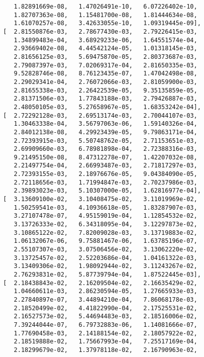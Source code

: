 \documentclass[11pt,a4j,fleqn]{jarticle}
\begin{document}
\begin{verbatim}
          1.82891669e-08,   1.47026491e-10,   6.07226402e-10,
          1.82707363e-08,   1.15481700e-08,   1.81444634e-08,
          1.61070257e-08,   3.42633055e-10,   1.09319445e-09],
       [  2.81550876e-03,   2.78677430e-03,   2.79226415e-03,
          1.34899483e-04,   3.68929233e-06,   1.64551574e-04,
          2.93669402e-08,   4.44542124e-05,   1.01318145e-03,
          2.81656125e-03,   5.69475870e-05,   2.80373687e-03,
          2.79087397e-03,   7.02069317e-04,   2.81650335e-03,
          9.52828746e-08,   8.76123435e-07,   1.47042498e-08,
          2.29029341e-04,   2.76072066e-03,   2.81059900e-03,
          2.81655338e-03,   2.26422539e-05,   9.35135859e-05,
          2.81371506e-03,   1.77843188e-03,   2.79426887e-03,
          2.48050105e-03,   5.27658967e-05,   1.68353242e-04],
       [  2.72292128e-03,   2.69513174e-03,   2.70044107e-03,
          1.30463338e-04,   3.56797063e-06,   1.59140326e-04,
          2.84012138e-08,   4.29923439e-05,   9.79863171e-04,
          2.72393915e-03,   5.50748762e-05,   2.71153651e-03,
          2.69909660e-03,   6.78981898e-04,   2.72388316e-03,
          9.21495150e-08,   8.47312278e-07,   1.42207032e-08,
          2.21497754e-04,   2.66993487e-03,   2.71817297e-03,
          2.72393155e-03,   2.18976676e-05,   9.04384090e-05,
          2.72118656e-03,   1.71994847e-03,   2.70237986e-03,
          2.39893023e-03,   5.10307000e-05,   1.62816977e-04],
       [  3.13609100e-02,   3.10408475e-02,   3.11019969e-02,
          1.50259541e-03,   4.10936618e-05,   1.83287907e-03,
          3.27107478e-07,   4.95159019e-04,   1.12854532e-02,
          3.13726333e-02,   6.34318095e-04,   3.12297873e-02,
          3.10865122e-02,   7.82009028e-03,   3.13719883e-02,
          1.06132067e-06,   9.75881467e-06,   1.63785196e-07,
          2.55107307e-03,   3.07506456e-02,   3.13062220e-02,
          3.13725457e-02,   2.52203686e-04,   1.04161322e-03,
          3.13409306e-02,   1.98092944e-02,   3.11243267e-02,
          2.76293831e-02,   5.87739794e-04,   1.87522445e-03],
       [  2.18438843e-02,   2.16209504e-02,   2.16635429e-02,
          1.04660611e-03,   2.86230594e-05,   1.27665933e-03,
          2.27840897e-07,   3.44894210e-04,   7.86068178e-03,
          2.18520499e-02,   4.41822990e-04,   2.17525531e-02,
          2.16527573e-02,   5.44694483e-03,   2.18516006e-02,
          7.39244044e-07,   6.79732883e-06,   1.14081666e-07,
          1.77690458e-03,   2.14188154e-02,   2.18057922e-02,
          2.18519888e-02,   1.75667993e-04,   7.25517169e-04,
          2.18299679e-02,   1.37978118e-02,   2.16790963e-02,

\end{verbatim}
\end{document}
